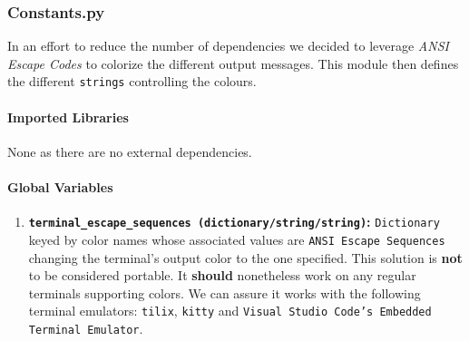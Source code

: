\subsubsection{Constants.py}
    In an effort to reduce the number of dependencies we decided to leverage \textit{ANSI Escape Codes} to colorize the different output messages. This module then defines the different \texttt{strings} controlling the colours.

    \paragraph{Imported Libraries}
        None as there are no external dependencies.

    \paragraph{Global Variables}
        \begin{enumerate}
            \item \textbf{\texttt{terminal\_escape\_sequences (dictionary/string/string)}:} \texttt{Dictionary} keyed by color names whose associated values are \texttt{ANSI Escape Sequences} changing the terminal's output color to the one specified. This solution is \textbf{not} to be considered portable. It \textbf{should} nonetheless work on any regular terminals supporting colors. We can assure it works with the following terminal emulators: \texttt{tilix}, \texttt{kitty} and \texttt{Visual Studio Code's Embedded Terminal Emulator}.
        \end{enumerate}